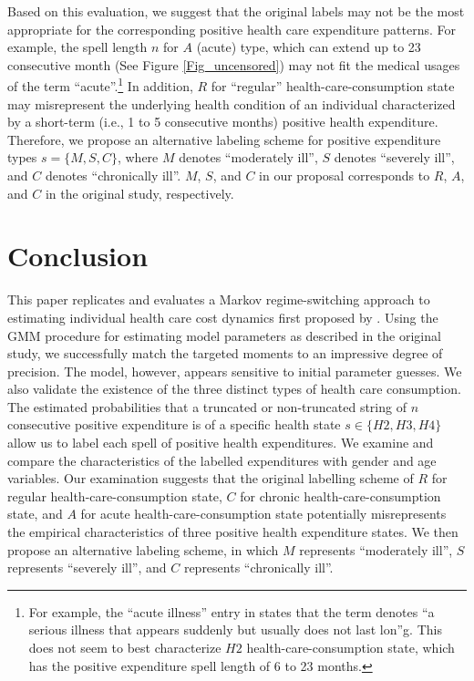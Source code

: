 \documentclass[letterpaper,12pt]{article}
\theoremstyle{definition}
\begin{document}
\begin{spacing}{1.5}{}
  Based on this evaluation, we suggest that the original labels may not be the most appropriate for the corresponding positive health care expenditure patterns. For example, the spell length $n$ for $A$ (acute) type, which can extend up to 23 consecutive month (See Figure \ref{Fig_uncensored}) may not fit the medical usages of the term ``acute''.\footnote{For example, the ``acute illness'' entry in \citet{med} states that the term denotes ``a serious illness that appears suddenly but usually does not last lon''g. This does not seem to best characterize $H2$ health-care-consumption state, which has the positive expenditure spell length of 6 to 23 months.} In addition, $R$ for ``regular'' health-care-consumption state may misrepresent the underlying health condition of an individual characterized by a short-term (i.e., 1 to 5 consecutive months) positive health expenditure. Therefore, we propose an alternative labeling scheme for positive expenditure types $s = \{M, S, C\}$, where $M$ denotes ``moderately ill'', $S$ denotes ``severely ill'', and $C$ denotes ``chronically ill''. $M$, $S$, and $C$ in our proposal corresponds to $R$, $A$, and $C$ in the original study, respectively.
     
  
\section{Conclusion}\label{SecConclusion}

  This paper replicates and evaluates a Markov regime-switching approach to estimating individual health care cost dynamics first proposed by \citet{evans}. Using the GMM procedure for estimating model parameters as described in the original study, we successfully match the targeted moments to an impressive degree of precision. The model, however, appears sensitive to initial parameter guesses. We also validate the existence of the three distinct types of health care consumption. The estimated probabilities that a truncated or non-truncated string of $n$ consecutive positive expenditure is of a specific health state $s \in \{H2, H3, H4\}$ allow us to label each spell of positive health expenditures. We examine and compare the characteristics of the labelled expenditures with gender and age variables. Our examination suggests that the original labelling scheme of $R$ for regular health-care-consumption state, $C$ for chronic health-care-consumption state, and $A$ for acute health-care-consumption state potentially misrepresents the empirical characteristics of three positive health expenditure states. We then propose an alternative labeling scheme, in which  $M$ represents ``moderately ill'', $S$ represents ``severely ill'', and $C$ represents ``chronically ill''.

  \clearpage


\end{spacing}
\end{document}
